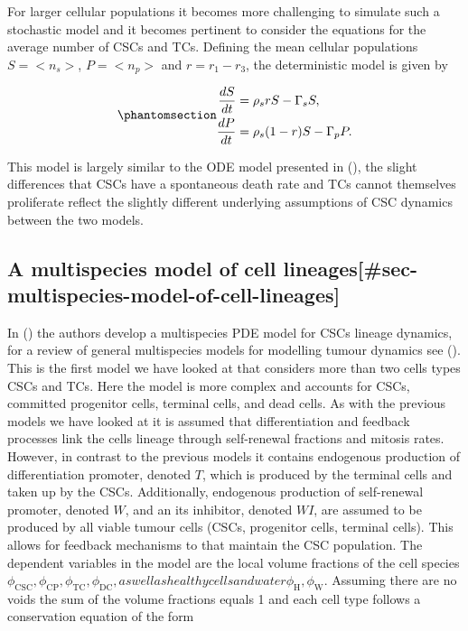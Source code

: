 \documentclass[
  letterpaper,
]{scrreprt}
\theoremstyle{definition}
\theoremstyle{remark}
\begin{document}
For larger cellular populations it becomes more challenging to simulate
such a stochastic model and it becomes pertinent to consider the
equations for the average number of CSCs and TCs. Defining the mean
cellular populations \(S = <n_s>\), \(P = <n_p>\) and \(r = r_1 - r_3\),
the deterministic model is given by

\begin{equation}\phantomsection\label{eq-deterministic-master-equation}{
\begin{aligned}
\frac{dS}{dt} &= \rho_s r S - \Gamma_s S, \\
\frac{dP}{dt} &= \rho_s (1-r) S - \Gamma_p P.
\end{aligned}
}\end{equation}

This model is largely similar to the ODE model presented in
(), the
slight differences that CSCs have a spontaneous death rate and TCs
cannot themselves proliferate reflect the slightly different underlying
assumptions of CSC dynamics between the two models.

\subsection{A multispecies model of cell
lineages{[}\#sec-multispecies-model-of-cell-lineages{]}}\label{a-multispecies-model-of-cell-lineagessec-multispecies-model-of-cell-lineages}

In () the authors
develop a multispecies PDE model for CSCs lineage dynamics, for a review
of general multispecies models for modelling tumour dynamics see
(). This is the first
model we have looked at that considers more than two cells types CSCs
and TCs. Here the model is more complex and accounts for CSCs, committed
progenitor cells, terminal cells, and dead cells. As with the previous
models we have looked at it is assumed that differentiation and feedback
processes link the cells lineage through self-renewal fractions and
mitosis rates. However, in contrast to the previous models it contains
endogenous production of differentiation promoter, denoted \(T\), which
is produced by the terminal cells and taken up by the CSCs.
Additionally, endogenous production of self-renewal promoter, denoted
\(W\), and an its inhibitor, denoted \(WI\), are assumed to be produced
by all viable tumour cells (CSCs, progenitor cells, terminal cells).
This allows for feedback mechanisms to that maintain the CSC population.
The dependent variables in the model are the local volume fractions of
the cell species
\(\phi_\text{CSC}, \phi_\text{CP}, \phi_\text{TC}, \phi_\text{DC}, as well as healthy cells and water \phi_\text{H}, \phi_\text{W}\).
Assuming there are no voids the sum of the volume fractions equals 1 and
each cell type follows a conservation equation of the form
\end{document}
